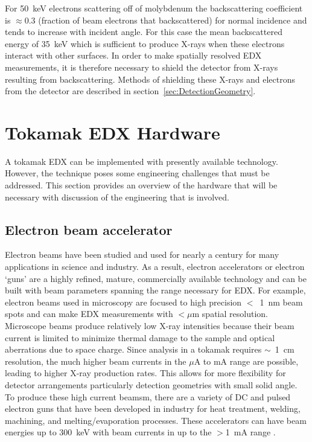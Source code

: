 \documentclass[12pt,letterpaper,final]{article}
\begin{document}
For 50~keV electrons scattering off of molybdenum the backscattering coefficient is $\approx 0.3$ (fraction of beam electrons that backscattered) for normal incidence and tends to increase with incident angle.  For this case the mean backscattered energy of 35~keV which is sufficient to produce X-rays when these electrons interact with other surfaces. In order to make spatially resolved EDX measurements, it is therefore necessary to shield the detector from X-rays resulting from backscattering. Methods of shielding these X-rays and electrons from the detector are described in section~\ref{sec:DetectionGeometry}.

\section{Tokamak EDX Hardware}

A tokamak EDX can be implemented with presently available technology.  However, the technique poses some engineering challenges that must be addressed. This section provides an overview of the hardware that will be necessary with discussion of the engineering that is involved.

\subsection{Electron beam accelerator}
\label{sec:ElectronGun}

Electron beams have been studied and used for nearly a century for many applications in science and industry. As a result, electron accelerators or electron `guns' are a highly refined, mature, commercially available technology and can be built with beam parameters spanning the range necessary for EDX. For example, electron beams used in microscopy are focused to high precision $<$~1~nm beam spots and can make EDX measurements with $<\mu$m spatial resolution. Microscope beams produce relatively low X-ray intensities because their beam current is limited to minimize thermal damage to the sample and optical aberrations due to space charge. Since analysis in a tokamak requires $\sim$~1~cm resolution, the much higher beam currents in the $\mu$A to mA range are possible, leading to higher X-ray production rates.  This allows for more flexibility for detector arrangements particularly detection geometries with small solid angle. To produce these high current beamsm, there are a variety of DC and pulsed electron guns that have been developed in industry for heat treatment, welding, machining, and melting/evaporation processes. These accelerators can have beam energies up to 300~keV with beam currents in up to the $>$1~mA range \cite{HammHamm}.
\end{document}
